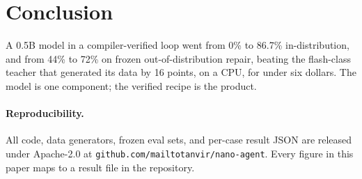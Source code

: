 \documentclass[10pt,twocolumn]{article}
\begin{document}
\section{Conclusion}

A 0.5B model in a compiler-verified loop went from 0\% to 86.7\% in-distribution,
and from 44\% to 72\% on frozen out-of-distribution repair, beating the
flash-class teacher that generated its data by 16 points, on a CPU, for under six
dollars. The model is one component; the verified recipe is the product.

\paragraph{Reproducibility.} All code, data generators, frozen eval sets, and
per-case result JSON are released under Apache-2.0 at
\texttt{github.com/mailtotanvir/nano-agent}. Every figure in this paper maps to a
result file in the repository.
\end{document}
